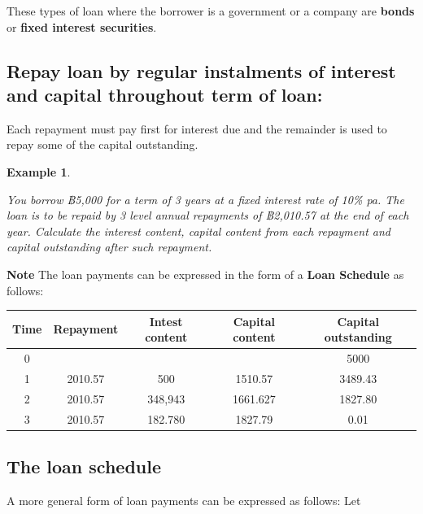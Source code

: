 \documentclass[
]{book}
\theoremstyle{definition}
\theoremstyle{definition}
\newtheorem{example}{Example}[chapter]
\theoremstyle{definition}
\theoremstyle{definition}
\theoremstyle{remark}
\begin{document}
These types of loan where the borrower is a government or a company are
\textbf{bonds} or \textbf{fixed interest securities}.

\hypertarget{repay-loan-by-regular-instalments-of-interest-and-capital-throughout-term-of-loan}{%
\subsection*{Repay loan by regular instalments of interest and capital throughout term of loan:}\label{repay-loan-by-regular-instalments-of-interest-and-capital-throughout-term-of-loan}}

Each repayment must pay first for interest due and the remainder is used
to repay some of the capital outstanding.

\begin{example}
\protect\hypertarget{exm:unlabeled-div-48}{}\label{exm:unlabeled-div-48}

\emph{You borrow ฿5,000 for a term of 3 years at a fixed interest rate of 10\%
pa. The loan is to be repaid by 3 level annual repayments of ฿2,010.57
at the end of each year. Calculate the interest content, capital content
from each repayment and capital outstanding after such repayment.}

\end{example}

\textbf{Note} The loan payments can be expressed in the form of a \textbf{Loan
Schedule} as follows:

\begin{longtable}[]{@{}ccccc@{}}
\toprule
Time & Repayment & Intest content & Capital content & Capital outstanding \\
\midrule
\endhead
0 & & & & 5000 \\
1 & 2010.57 & 500 & 1510.57 & 3489.43 \\
2 & 2010.57 & 348,943 & 1661.627 & 1827.80 \\
3 & 2010.57 & 182.780 & 1827.79 & 0.01 \\
\bottomrule
\end{longtable}

\hypertarget{the-loan-schedule}{%
\subsection{The loan schedule}\label{the-loan-schedule}}

A more general form of loan payments can be expressed as follows: Let
\end{document}
